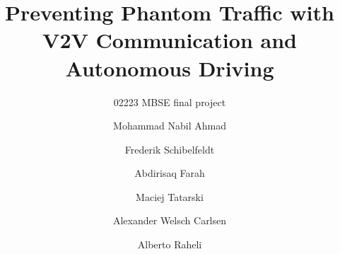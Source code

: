 \documentclass[sigconf]{acmart}
\begin{document}
\begin{titlepage}
    
\end{titlepage}

\title{Preventing Phantom Traffic with V2V Communication and Autonomous Driving}
\subtitle{02223 MBSE final project}


\author{Mohammad Nabil Ahmad}
\affiliation{%
}
\author{Frederik Schibelfeldt}
\affiliation{%
}
\author{Abdirisaq Farah}
\affiliation{%
}

\author{Maciej Tatarski}
\affiliation{%
}
\author{Alexander Welsch Carlsen}
\affiliation{%
}
\author{Alberto Raheli}
\affiliation{%
}

\maketitle











 

\clearpage

\end{document}
